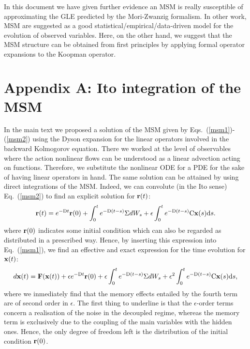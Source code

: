 \documentclass[12pt]{article}
\begin{document}
In this document we have given further evidence an MSM is really susceptible of approximating the GLE predicted by the Mori-Zwanzig formalism. In other work, MSM are suggested as a good statistical/empirical/data-driven model for the evolution of observed variables. Here, on the other hand, we suggest that the MSM structure can be obtained from first principles by applying formal operator expansions to the Koopman operator.


 


\pagebreak

\section*{Appendix A: Ito integration of the MSM}

In the main text we proposed a solution of the MSM given by Eqs.~(\ref{msm1})-(\ref{msm2}) using the Dyson expansion for the linear operators involved in the backward Kolmogorov equation. There we worked at the level of observables where the action nonlinear flows can be understood as a linear advection acting on functions. Therefore, we substitute the nonlinear ODE for a PDE for the sake of having linear operators in hand. The same solution can be attained by using direct integrations of the MSM. Indeed, we can convolute (in the Ito sense) Eq.~(\ref{msm2}) to find an explicit solution for $\mathbf{r}(t)$:
\begin{equation}
\mathbf{r} (t) = e^{-\mathrm{D}t}\mathbf{r} (0) + \int _{0}^te^{-\mathrm{D}(t-s)} \Sigma dW_s + \epsilon \int _{0}^{t}e^{-\mathrm{D}(t-s)}\mathrm{C}\mathbf{x}(s)\mathrm{d} s.
\end{equation}
where $\mathbf{r}(0)$ indicates some initial condition which can also be regarded as distributed in a prescribed way. Hence, by inserting this expression into Eq.~(\ref{msm1}), we find an effective and exact expression for the time evolution for $\mathbf{x} (t)$:
\begin{equation}
d\mathbf{x}(t) =\mathbf{F} (\mathbf{x}(t)) + \epsilon e^{-\mathrm{D}t}\mathbf{r} (0) + \epsilon \int _{0}^te^{-\mathrm{D}(t-s)} \Sigma dW_s + \epsilon ^2 \int _{0}^{t}e^{-\mathrm{D}(t-s)}\mathrm{C}\mathbf{x}(s)\mathrm{d} s,
\end{equation}
where we inmediately find that the memory effects entailed by the fourth term are of second order in $\epsilon$. The first thing to underline is that the $\epsilon$-order terms concern a realisation of the noise in the decoupled regime, whereas the memory term is exclusively due to the coupling of the main variables with the hidden ones. Hence, the only degree of freedom left is the distribution of the initial condition $\mathbf{r}(0)$.
\end{document}
